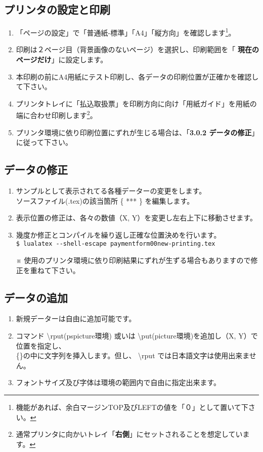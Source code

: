 \documentclass[a4paper,10pt,titlepage]{ltjsarticle}
\def\colH#1{\color[HTML]{#1}}
\def\bs#1{\textbackslash{#1}}
\begin{document}
\subsection{プリンタの設定と印刷}
\begin{enumerate}
  \item 「ページの設定」で「普通紙-標準」「A4」「縦方向」を確認します\footnote{機能があれば、余白マージンTOP及びLEFTの値を「０」として置いて下さい。}。
  \item 印刷は２ページ目（背景画像のないページ）を選択し、印刷範囲を「{\bfseries\colH{800000} 現在のページだけ}」に設定します。
  \item 本印刷の前にA4用紙にテスト印刷し、各データの印刷位置が正確かを確認して下さい。
  \item プリンタトレイに「払込取扱票」を印刷方向に向け「用紙ガイド」を用紙の端に合わせ印刷します\footnote{通常プリンタに向かいトレイ「{\bfseries 右側}」にセットされることを想定しています。}。
  \item プリンタ環境に依り印刷位置にずれが生じる場合は、「{\bfseries 3.0.2 データの修正}」に従って下さい。

\end{enumerate}

\subsection{データの修正}
 \begin{enumerate}
   \item サンプルとして表示されてる各種データーの変更をします。\\
   ソースファイル(.tex)の該当箇所 \{\; *** \;\} を編集します。

   \item 表示位置の修正は、各々の数値（\;X, Y\;）を変更し左右上下に移動させます。

   \item 幾度か修正とコンパイルを繰り返し正確な位置決めを行います。\\
   \verb|$ lualatex --shell-escape paymentform00new-printing.tex|           
  \item[※] 使用のプリンタ環境に依り印刷結果にずれが生ずる場合もありますので修正を重ねて下さい。
 \end{enumerate}

\subsection{データの追加}
 \begin{enumerate}
   \item 新規データーは自由に追加可能です。
   \item コマンド {\colH{800000} \bs rput}(pspicture環境) 或いは {\colH{800000} \bs put}(picture環境)を追加し（\;X, Y\;）で位置を指定し、\\
   \{\quad \}の中に文字列を挿入します。但し、 {\colH{800000} \bs rput では日本語文字は使用出来ません}。
   \item フォントサイズ及び字体は環境の範囲内で自由に指定出来ます。
   　
 \end{enumerate}
\end{document}
